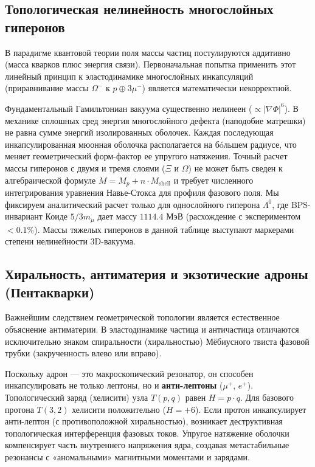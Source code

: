 \documentclass[12pt,a4paper]{article}
\begin{document}
	\subsection{Топологическая нелинейность многослойных гиперонов}
	В парадигме квантовой теории поля массы частиц постулируются аддитивно (масса кварков плюс энергия связи). Первоначальная попытка применить этот линейный принцип к эластодинамике многослойных инкапсуляций (приравнивание массы $\Omega^-$ к $p \oplus 3\mu^-$) является математически некорректной.
	
	Фундаментальный Гамильтониан вакуума существенно нелинеен ($\propto |\nabla \Phi|^6$). В механике сплошных сред энергия многослойного дефекта (наподобие матрешки) не равна сумме энергий изолированных оболочек. Каждая последующая инкапсулированная мюонная оболочка располагается на бóльшем радиусе, что меняет геометрический форм-фактор ее упругого натяжения.
	Точный расчет массы гиперонов с двумя и тремя слоями ($\Xi$ и $\Omega$) не может быть сведен к алгебраической формуле $M = M_p + n \cdot M_{\text{shell}}$ и требует численного интегрирования уравнения Навье-Стокса для профиля фазового поля. Мы фиксируем аналитический расчет только для однослойного гиперона $\Lambda^0$, где BPS-инвариант Коиде $5/3 m_\mu$ дает массу $1114.4$ МэВ (расхождение с экспериментом $< 0.1\%$). Массы тяжелых гиперонов в данной таблице выступают маркерами степени нелинейности 3D-вакуума.
		
	\subsection{Хиральность, антиматерия и экзотические адроны (Пентакварки)}
	Важнейшим следствием геометрической топологии является естественное объяснение антиматерии. В эластодинамике частица и античастица отличаются исключительно знаком спиральности (хиральностью) Мёбиусного твиста фазовой трубки (закрученность влево или вправо).
	
	Поскольку адрон — это макроскопический резонатор, он способен инкапсулировать не только лептоны, но и \textbf{анти-лептоны} ($\mu^+$, $e^+$). Топологический заряд (хелисити) узла $T(p,q)$ равен $H = p \cdot q$. Для базового протона $T(3,2)$ хелисити положительно ($H = +6$). 
	Если протон инкапсулирует анти-лептон (с противоположной хиральностью), возникает деструктивная топологическая интерференция фазовых токов. Упругое натяжение оболочки компенсирует часть внутреннего напряжения ядра, создавая метастабильные резонансы с «аномальными» магнитными моментами и зарядами.
	
\end{document}
